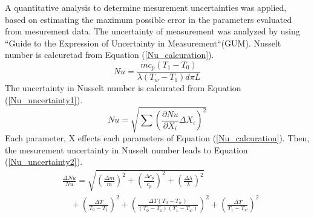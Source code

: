 \documentclass[conference]{IEEEtran}
\begin{document}
A quantitative analysis to determine mesurement uncertainties was applied,
based on estimating the maximum possible error in the parameters evaluated from mesurement data.
The uncertainty of measurement was analyzed by using ``Guide to the Expression of Uncertainty in Measurement``(GUM).
Nusselt number is calcuretad from Equation (\ref{Nu_calcuration}).
\begin{equation}
    Nu=\frac{\dot{m} c_{p}(T_{1}-T_{0})}{\lambda (T_{w}-T_{1}) d\pi L}\label{Nu_calcuration}
\end{equation}
The uncertainty in Nusselt number is calcurated from Equation (\ref{Nu_uncertainty1}).
\begin{equation}
    Nu=\sqrt{\sum \left(\frac{\partial Nu}{\partial X_{i}} \Delta X_{i}\right)^{2}}\label{Nu_uncertainty1}
\end{equation}
Each parameter, X effects each parameters of Equation (\ref{Nu_calcuration}).
Then, the mesurement uncertainty in Nusselt number leads to Equation (\ref{Nu_uncertainty2}).
\begin{equation}
    \begin{split}
        &\frac{\Delta Nu}{Nu} =\sqrt{\left(\frac{\Delta \dot{m}}{\dot{m}}\right)^{2}+\left(\frac{\Delta c_{p}}{c_{p}}\right)^{2}+\left(\frac{\Delta \lambda}{\lambda}\right)^{2}}\\
        &\quad +\left(\frac{\Delta T}{T_{0}-T_{1}}\right)^{2}+\left(\frac{\Delta T(T_{0}-T_{w})}{(T_{0}-T_{1})(T_{1}-T_{w})}\right)^{2}+\left(\frac{\Delta T}{T_{1}-T_{w}}\right)^{2}\\
        \label{Nu_uncertainty2}
    \end{split}
\end{equation}
\end{document}
